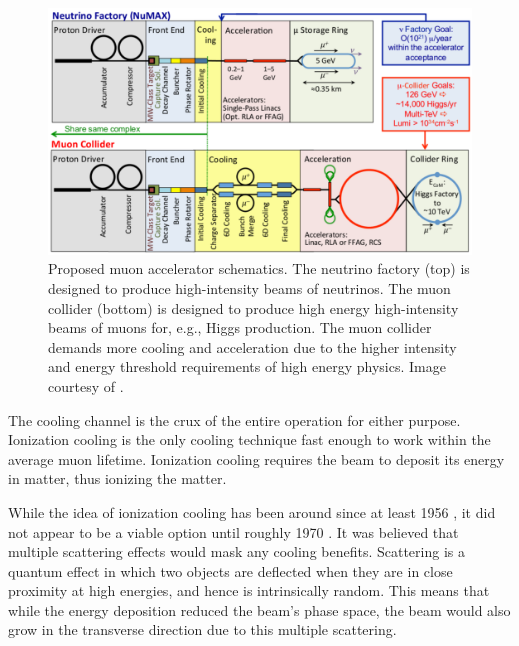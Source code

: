 \begin{figure}
  \centering
    \includegraphics[width=\textwidth]{Figures/muon_accelerator_schematic} 
  \caption[Proposed muon accelerator schematics.]{Proposed muon accelerator schematics. The neutrino factory (top) is designed to produce high-intensity beams of neutrinos. The muon collider (bottom) is designed to produce high energy high-intensity beams of muons for, e.g., Higgs production. The muon collider demands more cooling and acceleration due to the higher intensity and energy threshold requirements of high energy physics. Image courtesy of \cite{map}.}
  \label{fig:muon_accelerator_schematic}
\end{figure}


The cooling channel is the crux of the entire operation for either purpose. Ionization cooling is the only cooling technique fast enough to work within the average muon lifetime. Ionization cooling requires the beam to deposit its energy in matter, thus ionizing the matter.

While the idea of ionization cooling has been around since at least 1956 \cite{oneill,lichtenberg}, it did not appear to be a viable option until roughly 1970 \cite{YuM}. It was believed that multiple scattering effects would mask any cooling benefits. Scattering is a quantum effect in which two objects are deflected when they are in close proximity at high energies, and hence is intrinsically random. This means that while the energy deposition reduced the beam's phase space, the beam would also grow in the transverse direction due to this multiple scattering.

